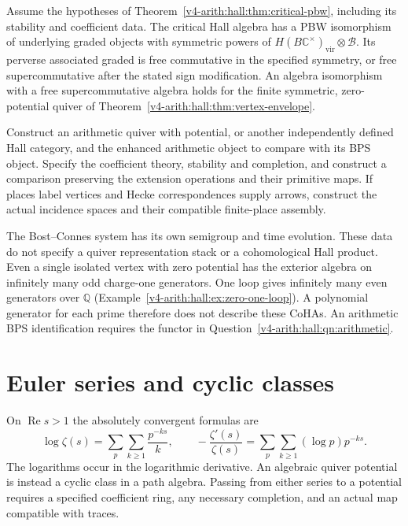 \begin{theorem}
\label{v4-arith:thm:davison-integrality}
Assume the hypotheses of Theorem~\ref{v4-arith:hall:thm:critical-pbw},
including its stability and coefficient data. The critical Hall algebra
has a PBW isomorphism of underlying graded objects with symmetric powers of
$H(B\mathbb C^\times)_{\mathrm{vir}}\otimes\mathcal B$.
Its perverse associated graded is free commutative in the specified
symmetry, or free supercommutative after the stated sign modification.
An algebra isomorphism with a free supercommutative algebra holds
for the finite symmetric, zero-potential quiver of
Theorem~\ref{v4-arith:hall:thm:vertex-envelope}.
\end{theorem}

\begin{question}
\label{v4-arith:thm:arithmetic-CoHA-conjectural}
Construct an arithmetic quiver with potential, or another independently
defined Hall category, and the enhanced arithmetic object to compare
with its BPS object. Specify the coefficient theory, stability and
completion, and construct a comparison preserving the extension
operations and their primitive maps. If places label vertices and
Hecke correspondences supply arrows, construct the actual incidence
spaces and their compatible finite-place assembly.
\end{question}

The Bost--Connes system has its own semigroup and time evolution.
These data do not specify a quiver representation stack or a
cohomological Hall product. Even a single isolated vertex with zero
potential has the exterior algebra on infinitely many odd charge-one
generators. One loop gives infinitely many even generators over
$\mathbb Q$ (Example~\ref{v4-arith:hall:ex:zero-one-loop}).
A polynomial generator for each prime therefore does not describe
these CoHAs. An arithmetic BPS identification requires the functor
in Question~\ref{v4-arith:hall:qn:arithmetic}.

\section{Euler series and cyclic classes}
\label{v4-arith:ks:logL-not-cyclic}

\begin{observation}
\label{v4-arith:obs:logL-not-cyclic}
On $\operatorname{Re}s>1$ the absolutely convergent formulas are
\[
 \log\zeta(s)=\sum_p\sum_{k\geq1}\frac{p^{-ks}}k,\qquad
 -\frac{\zeta'(s)}{\zeta(s)}
       =\sum_p\sum_{k\geq1}(\log p)p^{-ks}.
\]
The logarithms occur in the logarithmic derivative. An algebraic
quiver potential is instead a cyclic class in a path algebra.
Passing from either series to a potential requires a specified
coefficient ring, any necessary completion, and an actual map
compatible with traces.
\end{observation}

